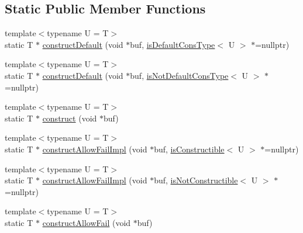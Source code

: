 \subsection*{Static Public Member Functions}
\begin{DoxyCompactItemize}
\item 
{\footnotesize template$<$typename U  = T$>$ }\\static T $\ast$ \hyperlink{structcheckpoint_1_1dispatch_1_1_reconstructor_af09a6d0312dbed7c8a311350b689794d}{construct\+Default} (void $\ast$buf, \hyperlink{structcheckpoint_1_1dispatch_1_1_reconstructor_ae91135a7a24b1008e7f184271fbc35d8}{is\+Default\+Cons\+Type}$<$ U $>$ $\ast$=nullptr)
\item 
{\footnotesize template$<$typename U  = T$>$ }\\static T $\ast$ \hyperlink{structcheckpoint_1_1dispatch_1_1_reconstructor_a74ded346aaee98f25dc498322e6e1411}{construct\+Default} (void $\ast$buf, \hyperlink{structcheckpoint_1_1dispatch_1_1_reconstructor_a0062e5edfdd87b34c3e5464d1f1020ec}{is\+Not\+Default\+Cons\+Type}$<$ U $>$ $\ast$=nullptr)
\item 
{\footnotesize template$<$typename U  = T$>$ }\\static T $\ast$ \hyperlink{structcheckpoint_1_1dispatch_1_1_reconstructor_a31a927731c0b265003a416e8d20616a1}{construct} (void $\ast$buf)
\item 
{\footnotesize template$<$typename U  = T$>$ }\\static T $\ast$ \hyperlink{structcheckpoint_1_1dispatch_1_1_reconstructor_ac4eac94cd715ae6637f5f5c52bb78584}{construct\+Allow\+Fail\+Impl} (void $\ast$buf, \hyperlink{structcheckpoint_1_1dispatch_1_1_reconstructor_a580580febf5689aeffcc477d304aa469}{is\+Constructible}$<$ U $>$ $\ast$=nullptr)
\item 
{\footnotesize template$<$typename U  = T$>$ }\\static T $\ast$ \hyperlink{structcheckpoint_1_1dispatch_1_1_reconstructor_a13e4fc01aaa73ef810d519a405f16264}{construct\+Allow\+Fail\+Impl} (void $\ast$buf, \hyperlink{structcheckpoint_1_1dispatch_1_1_reconstructor_a6220795c08856d2f0d86f1659647e2f0}{is\+Not\+Constructible}$<$ U $>$ $\ast$=nullptr)
\item 
{\footnotesize template$<$typename U  = T$>$ }\\static T $\ast$ \hyperlink{structcheckpoint_1_1dispatch_1_1_reconstructor_afbfa29526948dda3d9d843a377f526fc}{construct\+Allow\+Fail} (void $\ast$buf)
\end{DoxyCompactItemize}


